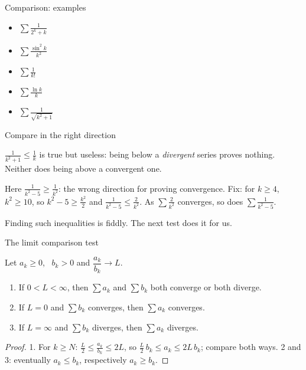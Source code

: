 \documentclass[10pt]{wosm-slides}
\begin{document}
\begin{frame}{Comparison: examples}
  \begin{itemize}
    \item $\displaystyle\sum \frac{1}{2^k + k}$
    \item $\displaystyle\sum \frac{\sin^2 k}{k^2}$
    \item $\displaystyle\sum \frac{1}{k!}$
    \item $\displaystyle\sum \frac{\ln k}{k}$
    \item $\displaystyle\sum \frac{1}{\sqrt{k^2 + 1}}$
  \end{itemize}
\end{frame}

\begin{frame}{Compare in the right direction}
  \begin{warning}
    $\frac{1}{k^2 + 1} \le \frac{1}{k}$ is true but useless: being below a \emph{divergent}
    series proves nothing. Neither does being above a convergent one.
  \end{warning}
  \pause
  \begin{example}[$\sum_{k=3}^\infty \frac{1}{k^2 - 5}$]
    Here $\frac{1}{k^2 - 5} \ge \frac{1}{k^2}$: the wrong direction for proving convergence.
    \pause
    Fix: for $k \ge 4$, $k^2 \ge 10$, so $k^2 - 5 \ge \frac{k^2}{2}$ and
    $\frac{1}{k^2 - 5} \le \frac{2}{k^2}$. As $\sum \frac{2}{k^2}$ converges,
    so does $\sum \frac{1}{k^2 - 5}$.
  \end{example}
  \pause
  Finding such inequalities is fiddly. The next test does it for us.
\end{frame}

\begin{frame}{The limit comparison test}
  \begin{theorem}
    Let $a_k \ge 0$, \ $b_k > 0$ and $\dfrac{a_k}{b_k} \to L$.
    \begin{enumerate}
      \item If $0 < L < \infty$, then $\sum a_k$ and $\sum b_k$ both converge or both diverge.
      \item If $L = 0$ and $\sum b_k$ converges, then $\sum a_k$ converges.
      \item If $L = \infty$ and $\sum b_k$ diverges, then $\sum a_k$ diverges.
    \end{enumerate}
  \end{theorem}
  \pause
  \begin{proof}
    1. For $k \ge N$: $\frac L2 \le \frac{a_k}{b_k} \le 2L$, so
    $\frac L2\, b_k \le a_k \le 2L\, b_k$; compare both ways.
    2 and 3: eventually $a_k \le b_k$, respectively $a_k \ge b_k$.
  \end{proof}
\end{frame}
\end{document}
